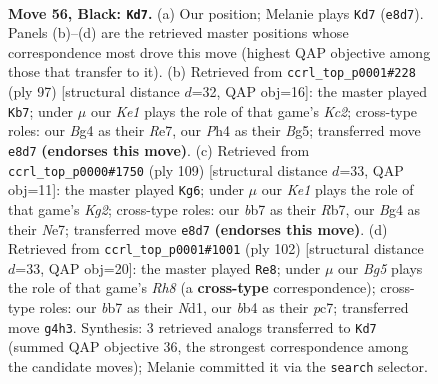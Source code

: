 \documentclass[11pt]{article}
\begin{document}
\clearpage

\begin{figure}[p]\centering
\begin{subfigure}{0.46\textwidth}\centering
\resizebox{\linewidth}{!}{%
\newchessgame
\chessboard[
  setfen={4k3/1B6/7r/8/PB4bp/1PK2p2/5R2/6N1 b - - 7 56},
  showmover=false,
  pgfstyle=straightmove, color=movearrow, markmove={e8-d7}
]}
\caption{}
\end{subfigure}\hfill
\begin{subfigure}{0.46\textwidth}\centering
\resizebox{\linewidth}{!}{%
\newchessgame
\chessboard[
  setfen={5N2/2k1r3/R3p3/6bB/1P2b1P1/1K6/1P6/8 b - - 2 49},
  showmover=false,
  pgfstyle=straightmove, color=movearrow, markmove={c7-b7}
]}
\caption{}
\end{subfigure}
\\[4pt]
\begin{subfigure}{0.46\textwidth}\centering
\resizebox{\linewidth}{!}{%
\newchessgame
\chessboard[
  setfen={8/1r2n1k1/R4p2/3p4/1p1N1Pb1/1B4P1/5K2/8 b - - 18 55},
  showmover=false,
  pgfstyle=straightmove, color=movearrow, markmove={g7-g6}
]}
\caption{}
\end{subfigure}\hfill
\begin{subfigure}{0.46\textwidth}\centering
\resizebox{\linewidth}{!}{%
\newchessgame
\chessboard[
  setfen={7R/2p1bP2/8/2k5/2p5/8/P5rP/1K1N4 w - - 5 52},
  showmover=false,
  pgfstyle=straightmove, color=movearrow, markmove={h8-e8}
]}
\caption{}
\end{subfigure}
\caption{\textbf{Move 56, Black: \texttt{Kd7}.} (a) Our position; Melanie plays \texttt{Kd7} (\texttt{e8d7}). Panels (b)--(d) are the retrieved master positions whose correspondence most drove this move (highest QAP objective among those that transfer to it). (b) Retrieved from \texttt{ccrl\_top\_p0001\#228} (ply 97) [structural distance $d$=32, QAP obj=16]: the master played \texttt{Kb7}; under $\mu$ our \emph{Ke1} plays the role of that game's \emph{Kc2}; cross-type roles: our \emph{B}g4 as their \emph{R}e7, our \emph{P}h4 as their \emph{B}g5; transferred move \texttt{e8d7} \textbf{(endorses this move)}. (c) Retrieved from \texttt{ccrl\_top\_p0000\#1750} (ply 109) [structural distance $d$=33, QAP obj=11]: the master played \texttt{Kg6}; under $\mu$ our \emph{Ke1} plays the role of that game's \emph{Kg2}; cross-type roles: our \emph{b}b7 as their \emph{R}b7, our \emph{B}g4 as their \emph{N}e7; transferred move \texttt{e8d7} \textbf{(endorses this move)}. (d) Retrieved from \texttt{ccrl\_top\_p0001\#1001} (ply 102) [structural distance $d$=33, QAP obj=20]: the master played \texttt{Re8}; under $\mu$ our \emph{Bg5} plays the role of that game's \emph{Rh8} (a \textbf{cross-type} correspondence); cross-type roles: our \emph{b}b7 as their \emph{N}d1, our \emph{b}b4 as their \emph{p}c7; transferred move \texttt{g4h3}. Synthesis: 3 retrieved analogs transferred to \texttt{Kd7} (summed QAP objective 36, the strongest correspondence among the candidate moves); Melanie committed it via the \texttt{search} selector.}
\label{fig:thought-m111}
\end{figure}
\end{document}
